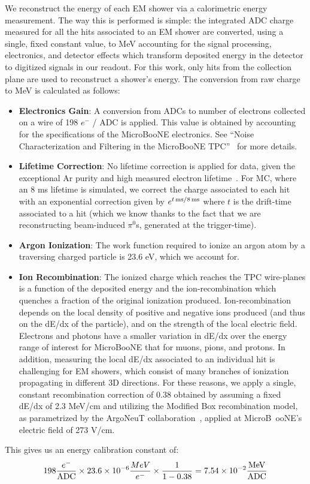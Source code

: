 \documentclass[a4paper]{article}
\begin{document}
\par We reconstruct the energy of each EM shower via a calorimetric energy measurement. The way this is performed is simple: the integrated ADC charge measured for all the hits associated to an EM shower are converted, using a single, fixed constant value, to MeV accounting for the signal processing, electronics, and detector effects which transform deposited energy in the detector to digitized signals in our readout. For this work, only hits from the collection plane are used to reconstruct a shower's energy. The conversion from raw charge to MeV is calculated as follows:
\begin{itemize}
\item {\bf Electronics Gain}: A conversion from ADCs to number of electrons collected on a wire of 198 $e^-$ / ADC is applied. This value is obtained by accounting for the specifications of the MicroBooNE electronics. See ``Noise Characterization and Filtering in the MicroBooNE TPC''~\cite{bib:noise} for more details.
\item {\bf Lifetime Correction}: No lifetime correction is applied for data, given the exceptional Ar purity and high measured electron lifetime~\cite{bib:purity}. For MC, where an 8 ms lifetime is simulated, we correct the charge associated to each hit with an exponential correction given by $e^{t \,{\rm ms} / 8 \,{\rm ms} }$ where $t$ is the drift-time associated to a hit (which we know thanks to the fact that we are reconstructing beam-induced $\pi^0$s, generated at the trigger-time).
\item {\bf Argon Ionization}: The work function required to ionize an argon atom by a traversing charged particle is 23.6 eV, which we account for.
\item {\bf Ion Recombination}: The ionized charge which reaches the TPC wire-planes is a function of the deposited energy and the ion-recombination which quenches a fraction of the original ionization produced. Ion-recombination depends on the local density of positive and negative ions produced (and thus on the dE/dx of the particle), and on the strength of the local electric field. Electrons and photons have a smaller variation in dE/dx over the energy range of interest for MicroBooNE that for muons, pions, and protons. In addition, measuring the local dE/dx associated to an individual hit is challenging for EM showers, which consist of many branches of ionization propagating in different 3D directions. For these reasons, we apply a single, constant recombination correction of 0.38 obtained by assuming a fixed dE/dx of 2.3 MeV/cm and utilizing the Modified Box recombination model, as parametrized by the ArgoNeuT collaboration~\cite{bib:argoneut_recomb}, applied at MicroB\
ooNE's electric field of 273 V/cm.
\end{itemize}
This gives us an energy calibration constant of:
\begin{equation}
  198 \frac{e^-}{\rm ADC} \times 23.6 \times 10^{-6} \frac{MeV}{e^-} \times \frac{1}{1-0.38} = 7.54 \times 10^{-2} \frac{\rm MeV}{\rm ADC}
\end{equation}
\end{document}
